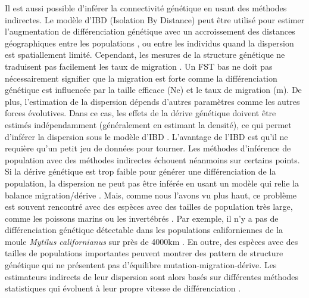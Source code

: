 \documentclass[a4paper,11pt,twoside]{report}
\begin{document}
Il est aussi possible d'inférer la connectivité génétique en usant des méthodes indirectes. Le modèle d'IBD (Isolation By Distance) peut être utilisé pour estimer l'augmentation de différenciation génétique avec un accroissement des distances géographiques entre les populations \cite{rousset1997genetic}, ou entre les individus \citep{rousset2000genetic} quand la dispersion est spatiallement limité. Cependant, les mesures de la structure génétique ne traduisent pas facilement les taux de migration \citep{whitlock1999indirect}\citep{marko2011complex}\citep{Gagnaire:2015aa}. Un FST bas ne doit pas nécessairement signifier que la migration est forte comme la différenciation génétique est influencée par la taille efficace (Ne) et le taux de migration (m). De plus, l'estimation de la dispersion dépends d'autres paramètres comme les autres forces évolutives. Dans ce cas, les effets de la dérive génétique doivent être estimés indépendamment (généralement en estimant la densité), ce qui permet d'inférer la dispersion sous le modèle d'IBD \citep{pinsky2010using}. L'avantage de l'IBD est qu'il ne requière qu'un petit jeu de données pour tourner. Les méthodes d'inférence de population avec des méthodes indirectes échouent néanmoins sur certains points. Si la dérive génétique est trop faible pour générer une différenciation de la population, la dispersion ne peut pas être inférée en usant un modèle qui relie la balance migration/dérive \citep{Gagnaire:2015aa}. Mais, comme nous l'avons vu plus haut, ce problème est souvent rencontré avec des espèces avec des tailles de population très large, comme les poissons marins ou les invertébrés \citep{dewoody2000microsatellite}\citep{mccusker2010positive}. Par exemple, il n'y a pas de différenciation génétique détectable dans les populations californiennes de la moule \textit{Mytilus californianus} sur près de 4000km \citep{addison2008range}. En outre, des espèces avec des tailles de populations importantes peuvent montrer des pattern de structure génétique qui ne présentent pas d'équilibre mutation-migration-dérive. Les estimateurs indirects de leur dispersion sont alors basés sur différentes méthodes statistiques qui évoluent à leur propre vitesse de différenciation \citep{Gagnaire:2015aa}. 
\end{document}
